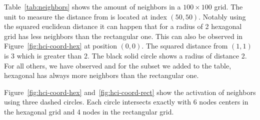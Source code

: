 \documentclass{acm_proc_article-sp}
\begin{document}
Table~\ref{tab:neighbors} shows the amount of neighbors in a $100\times100$ grid. The unit to measure the distance from is located at index $(50,50)$. Notably using the squared euclidean distance it can happen that for a radius of 2 hexagonal grid has less neighbors than the rectangular one. This can also be observed in Figure~\ref{fig:hci-coord-hex} at position $(0,0)$. The squared distance from $(1,1)$ is 3 which is greater than 2. The black solid circle shows a radius of distance 2.
For all others, we have observed and for the subset we added to the table, hexagonal has always more neighbors than the rectangular one.

Figure~\ref{fig:hci-coord-hex} and~\ref{fig:hci-coord-rect} show the activation of neighbors using three dashed circles. Each circle intersects exactly with 6 nodes centers in the hexagonal grid and 4 nodes in the rectangular grid.

\end{document}
